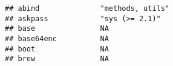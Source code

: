 \documentclass[
]{article}
\begin{document}
\begin{verbatim}
## abind              "methods, utils"                                                                                                                                                                                                                                                                                                                                                                                                                             
## askpass            "sys (>= 2.1)"                                                                                                                                                                                                                                                                                                                                                                                                                               
## base               NA                                                                                                                                                                                                                                                                                                                                                                                                                                           
## base64enc          NA                                                                                                                                                                                                                                                                                                                                                                                                                                           
## boot               NA                                                                                                                                                                                                                                                                                                                                                                                                                                           
## brew               NA                                                                                                                                                                                                                                                                                                                                                                                                                                           

\end{verbatim}
\end{document}
